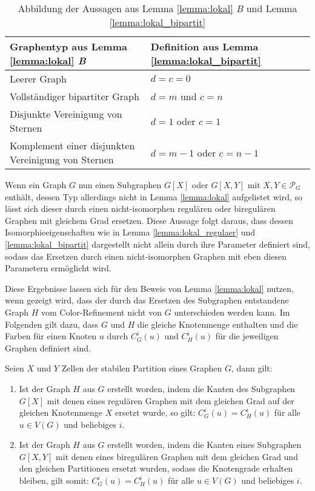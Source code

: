 \begin{table}
	\centering
	\begin{tabular}{|l|l|}
		\hline 
		Graphentyp aus Lemma \ref{lemma:lokal} \emph{B} & Definition aus Lemma \ref{lemma:lokal_bipartit} \\ 
		\hline 
		Leerer Graph & $d=c=0$ \\ 
		\hline 
		Vollständiger bipartiter Graph & $d=m$ und $c=n$ \\ 
		\hline 
		Disjunkte Vereinigung von Sternen & $d=1$ oder $c=1$ \\ 
		\hline 
		Komplement einer disjunkten Vereinigung von Sternen & $d=m-1$ oder $c=n-1$ \\ 
		\hline 
	\end{tabular}
	\caption{Abbildung der Aussagen aus Lemma \ref{lemma:lokal} \emph{B} und Lemma \ref{lemma:lokal_bipartit}}
	\label{tab:mapping_bipartit}
\end{table}

Wenn ein Graph $G$ nun einen Subgraphen $G[X]$ oder $G[X,Y]$ mit $X,Y\in \mathcal{P}_G$ enthält, dessen Typ allerdings nicht in Lemma \ref{lemma:lokal} aufgelistet wird, so lässt sich dieser durch einen nicht-isomorphen regulären oder biregulären Graphen mit gleichem Grad ersetzen. Diese Aussage folgt daraus, dass dessen Isomorphieeigenschaften wie in Lemma \ref{lemma:lokal_regulaer} und \ref{lemma:lokal_bipartit} dargestellt nicht allein durch ihre Parameter definiert sind, sodass das Ersetzen durch einen nicht-isomorphen Graphen mit eben diesen Parametern ermöglicht wird.

Diese Ergebnisse lassen sich für den Beweis von Lemma \ref{lemma:lokal} nutzen, wenn gezeigt wird, dass der durch das Ersetzen des Subgraphen entstandene Graph $H$ vom Color-Refinement nicht von $G$ unterschieden werden kann. Im Folgenden gilt dazu, dass $G$ und $H$ die gleiche Knotenmenge enthalten und die Farben für einen Knoten $u$ durch $C^i_G(u)$ und $C^i_H(u)$ für die jeweiligen Graphen definiert sind.

\begin{Lemma}
	Seien $X$ und $Y$ Zellen der stabilen Partition eines Graphen $G$, dann gilt:
	\begin{enumerate}[label=(\alph*)]
		\item  Ist der Graph $H$ aus $G$ erstellt worden, indem die Kanten des Subgraphen $G[X]$ mit denen eines regulären Graphen mit dem gleichen Grad auf der gleichen Knotenmenge $X$ ersetzt wurde, so gilt: $C^i_G(u)=C^i_H(u)$ für alle $u\in V(G)$ und beliebiges $i$.
		\item Ist der Graph $H$ aus $G$ erstellt worden, indem die Kanten eines Subgraphen $G[X,Y]$ mit denen eines biregulären Graphen mit dem gleichen Grad und den gleichen Partitionen ersetzt wurden, sodass die Knotengrade erhalten bleiben, gilt somit: $C^i_G(u)=C^i_H(u)$ für alle $u\in V(G)$ und beliebiges $i$.
	\end{enumerate}
	\label{lemma:lokal_nicht_unterscheidbar}
\end{Lemma}

